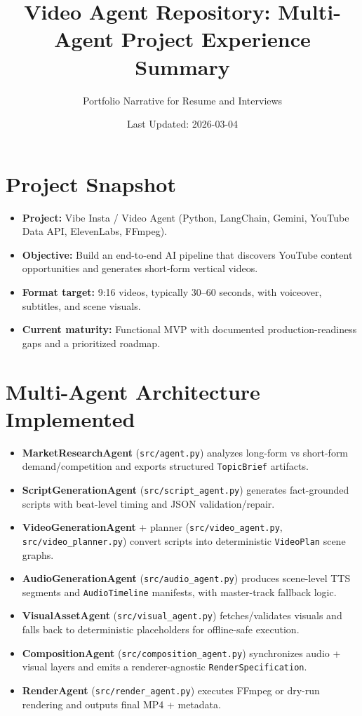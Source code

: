 \documentclass{article}
\title{Video Agent Repository: Multi-Agent Project Experience Summary}
\author{Portfolio Narrative for Resume and Interviews}
\date{Last Updated: 2026-03-04}
\begin{document}
\maketitle

\section{Project Snapshot}
\begin{itemize}
    \item \textbf{Project:} Vibe Insta / Video Agent (Python, LangChain, Gemini, YouTube Data API, ElevenLabs, FFmpeg).
    \item \textbf{Objective:} Build an end-to-end AI pipeline that discovers YouTube content opportunities and generates short-form vertical videos.
    \item \textbf{Format target:} 9:16 videos, typically 30--60 seconds, with voiceover, subtitles, and scene visuals.
    \item \textbf{Current maturity:} Functional MVP with documented production-readiness gaps and a prioritized roadmap.
\end{itemize}

\section{Multi-Agent Architecture Implemented}
\begin{itemize}
    \item \textbf{MarketResearchAgent} (\texttt{src/agent.py}) analyzes long-form vs short-form demand/competition and exports structured \texttt{TopicBrief} artifacts.
    \item \textbf{ScriptGenerationAgent} (\texttt{src/script\_agent.py}) generates fact-grounded scripts with beat-level timing and JSON validation/repair.
    \item \textbf{VideoGenerationAgent} + planner (\texttt{src/video\_agent.py}, \texttt{src/video\_planner.py}) convert scripts into deterministic \texttt{VideoPlan} scene graphs.
    \item \textbf{AudioGenerationAgent} (\texttt{src/audio\_agent.py}) produces scene-level TTS segments and \texttt{AudioTimeline} manifests, with master-track fallback logic.
    \item \textbf{VisualAssetAgent} (\texttt{src/visual\_agent.py}) fetches/validates visuals and falls back to deterministic placeholders for offline-safe execution.
    \item \textbf{CompositionAgent} (\texttt{src/composition\_agent.py}) synchronizes audio + visual layers and emits a renderer-agnostic \texttt{RenderSpecification}.
    \item \textbf{RenderAgent} (\texttt{src/render\_agent.py}) executes FFmpeg or dry-run rendering and outputs final MP4 + metadata.
\end{itemize}
\end{document}
